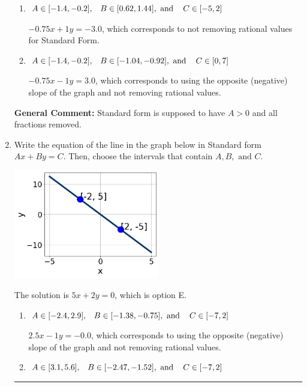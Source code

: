 \documentclass{extbook}[14pt]
\newcommand{\litem}[1]{\item #1

\rule{\textwidth}{0.4pt}}
\begin{document}
\begin{enumerate}
{\begin{enumerate}[label=\Alph*.]
 $3x + 4y = -12$, which corresponds to using the opposite (negative) slope of the graph, but did everything else correctly.
\item \( A \in [-1.4, -0.2], \hspace{3mm} B \in [0.62, 1.44], \text{ and } \hspace{3mm} C \in [-5, 2] \)

 $-0.75x + 1y = -3.0$, which corresponds to not removing rational values for Standard Form.
\item \( A \in [-1.4, -0.2], \hspace{3mm} B \in [-1.04, -0.92], \text{ and } \hspace{3mm} C \in [0, 7] \)

 $-0.75x - 1y = 3.0$, which corresponds to using the opposite (negative) slope of the graph and not removing rational values.
\end{enumerate}

\textbf{General Comment:} Standard form is supposed to have $A > 0$ and all fractions removed.
}
\litem{
Write the equation of the line in the graph below in Standard form $Ax+By=C$. Then, choose the intervals that contain $A, B, \text{ and } C$.

\begin{center}
    \includegraphics[width=0.5\textwidth]{../Figures/linearGraphToStandardB.png}
\end{center}


The solution is \( 5x + 2y = 0 \), which is option E.\begin{enumerate}[label=\Alph*.]
\item \( A \in [-2.4, 2.9], \hspace{3mm} B \in [-1.38, -0.75], \text{ and } \hspace{3mm} C \in [-7, 2] \)

 $2.5x - 1y = -0.0$, which corresponds to using the opposite (negative) slope of the graph and not removing rational values.
\item \( A \in [3.1, 5.6], \hspace{3mm} B \in [-2.47, -1.52], \text{ and } \hspace{3mm} C \in [-7, 2] \)


\end{enumerate}}
\end{enumerate}
\end{document}
